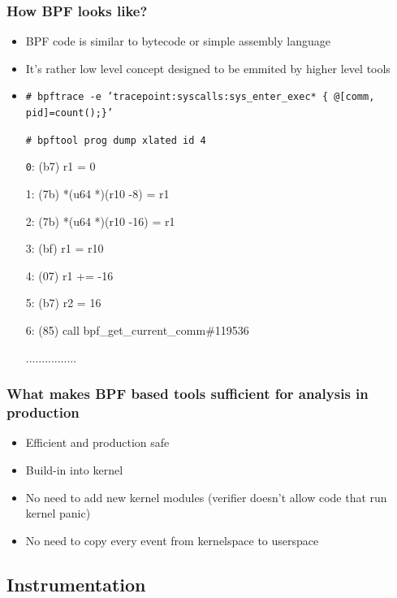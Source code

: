 \documentclass{beamer}
\begin{document}
\begin{frame}
  \frametitle{How BPF looks like?}
  \begin{itemize}
    \item<1-> BPF code is similar to bytecode or simple assembly language
    \item<2-> It's rather low level concept designed to be emmited by higher level tools
    \item<3-> {\scriptsize \texttt{\# bpftrace -e 'tracepoint:syscalls:sys\_enter\_exec* \{ @[comm, pid]=count();\}' }}
		\begin{block}{\scriptsize \texttt{\# bpftool prog dump xlated id 4}}
      {\texttt 
			 0: (b7) r1 = 0

			 1: (7b) *(u64 *)(r10 -8) = r1

			 2: (7b) *(u64 *)(r10 -16) = r1

			 3: (bf) r1 = r10

			 4: (07) r1 += -16

			 5: (b7) r2 = 16

			 6: (85) call bpf\_get\_current\_comm\#119536
			 
			 ................
		  }
      \end{block}
  \end{itemize}
\end{frame}

\begin{frame}
  \frametitle{What makes BPF based tools sufficient for analysis in production}
  \begin{itemize}
    \item<1-> Efficient and production safe 
		\item<2-> Build-in into kernel
    \item<3-> No need to add new kernel modules (verifier doesn't allow code that run kernel panic)
		\item<4-> No need to copy every event from kernelspace to userspace 
	\end{itemize}
\end{frame}

\subsection{Instrumentation}
\end{document}
